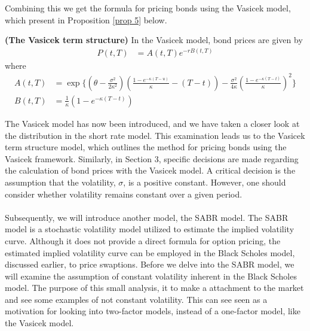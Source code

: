  Combining this we get the formula for pricing bonds using the Vasicek model, which present 
 in Proposition \autoref{prop 5} below. 
\begin{proposition}
    \label{prop 5}
    \textbf{(The Vasicek term structure)} In the Vasicek model, bond prices are given by
 \begin{align}
    P(t,T) &= A(t,T) e^{-rB(t,T)} 
\end{align}
where
\begin{align*}
    A(t,T)&= \exp \Biggl\{\left(\theta-\frac{\sigma^2}{2 \kappa^2}\right)\left(\frac{1-e^{-\kappa(T-u)}}{\kappa}-(T-t)\right)
    -\frac{\sigma^2}{4 \kappa}\left(\frac{1-e^{-\kappa(T-t)}}{\kappa}\right)^2 \Biggr\} \\
    B(t,T) & =\frac{1}{\kappa} \left( 1 - e^{-\kappa (T-t)} \right)  
\end{align*}
\cite{Bjork}

\end{proposition}
\noindent
The Vasicek model has now been introduced, and we have taken a closer look at the distribution in the short rate model. 
This examination leads us to the Vasicek term structure model, which outlines the method for pricing bonds using the 
Vasicek framework. Similarly, in Section 3, specific decisions are made regarding the calculation of bond prices with 
the Vasicek model. A critical decision is the assumption that the volatility, 
$\sigma$, is a positive constant. However, one should consider whether volatility remains constant over a given period.
\\\\
Subsequently, we will introduce another model, the SABR model. The SABR model is a stochastic volatility model 
utilized to estimate the implied volatility curve. Although it does not provide a direct formula for option pricing, 
the estimated implied volatility curve can be employed in the Black Scholes model, discussed earlier, to price swaptions. 
Before we delve into the SABR model, we will examine the assumption of constant volatility inherent in the Black Scholes model.
The purpose of this small analysis, it to make a attachment to the
market and see some examples of not constant volatility. This can 
see seen as a motivation for looking into two-factor models, 
instead of a one-factor model, like the Vasicek model. 
